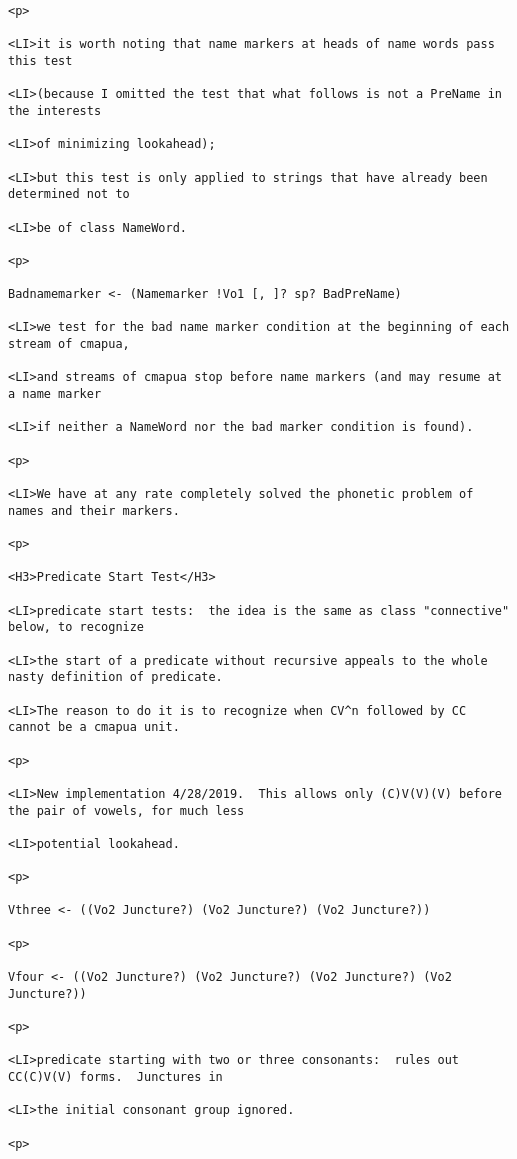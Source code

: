 \documentclass[12pt]{article}
\begin{document}
\begin{lstlisting}
<p>

<LI>it is worth noting that name markers at heads of name words pass this test

<LI>(because I omitted the test that what follows is not a PreName in the interests

<LI>of minimizing lookahead);

<LI>but this test is only applied to strings that have already been determined not to

<LI>be of class NameWord.

<p>

Badnamemarker <- (Namemarker !Vo1 [, ]? sp? BadPreName)

<LI>we test for the bad name marker condition at the beginning of each stream of cmapua,

<LI>and streams of cmapua stop before name markers (and may resume at a name marker

<LI>if neither a NameWord nor the bad marker condition is found).

<p>

<LI>We have at any rate completely solved the phonetic problem of names and their markers.

<p>

<H3>Predicate Start Test</H3>

<LI>predicate start tests:  the idea is the same as class "connective" below, to recognize

<LI>the start of a predicate without recursive appeals to the whole nasty definition of predicate.

<LI>The reason to do it is to recognize when CV^n followed by CC cannot be a cmapua unit.

<p>

<LI>New implementation 4/28/2019.  This allows only (C)V(V)(V) before the pair of vowels, for much less

<LI>potential lookahead.

<p>

Vthree <- ((Vo2 Juncture?) (Vo2 Juncture?) (Vo2 Juncture?))

<p>

Vfour <- ((Vo2 Juncture?) (Vo2 Juncture?) (Vo2 Juncture?) (Vo2 Juncture?))

<p>

<LI>predicate starting with two or three consonants:  rules out CC(C)V(V) forms.  Junctures in

<LI>the initial consonant group ignored.

<p>


\end{lstlisting}
\end{document}
